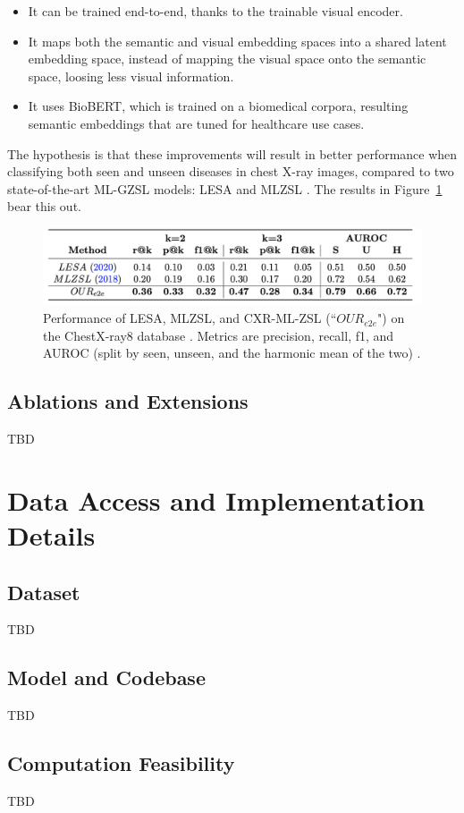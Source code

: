 \documentclass[letterpaper]{article} %
\begin{document}
\begin{itemize}
    \item It can be trained end-to-end, thanks to the trainable visual encoder.
    \item It maps both the semantic and visual embedding spaces into a shared latent embedding space, instead of mapping the visual space onto the semantic space, loosing less visual information.
    \item It uses BioBERT, which is trained on a biomedical corpora, resulting semantic embeddings that are tuned for healthcare use cases.
\end{itemize}

The hypothesis is that these improvements will result in better performance when classifying both seen and unseen diseases in chest X-ray images, compared to two state-of-the-art ML-GZSL models: LESA \cite{9157745} and MLZSL \cite{lee2018multilabelzeroshotlearningstructured}. The results in Figure~\ref{fig:results} bear this out.

\begin{figure}[h!]
\centering
\includegraphics[width=0.9\columnwidth]{results.png}
\caption{Performance of LESA, MLZSL, and CXR-ML-ZSL (``$OUR_{e2e}$") on the ChestX-ray8 database \cite{Wang_2017}. Metrics are precision, recall, f1, and AUROC (split by seen, unseen, and the harmonic mean of the two) \cite{hayat2021multilabel}.}
\label{fig:results}
\end{figure}

\subsection{Ablations and Extensions}
\label{sec:ablations-and-extensions}

TBD

\section{Data Access and Implementation Details}

\subsection{Dataset}

TBD

\subsection{Model and Codebase}

TBD

\subsection{Computation Feasibility}
\label{sec:computation-feasibility}

TBD


\end{document}
